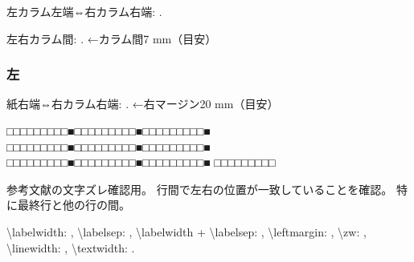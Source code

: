 \documentclass{FITpaper}
\begin{document}
左カラム左端⇔右カラム右端:
\prntlen{\textwidth}.

左右カラム間:
\prntlen{\columnsep}.
←カラム間7 mm（目安）

\subsubsection{左}

\newlength{\myright}
\setlength{\myright}{\paperwidth}

\addtolength\myright{-\myleft}
\addtolength\myright{-\textwidth}

紙右端⇔右カラム右端:
\prntlen{\myright}.
←右マージン20 mm（目安）


\begin{thebibliography}{9}

  □□□□□□□□□■□□□□□□□□□■□□□□□□□□□■
  □□□□□□□□□■□□□□□□□□□■□□□□□□□□□■
  □□□□□□□□□■□□□□□□□□□■□□□□□□□□□■
  □□□□□□□□□

  参考文献の文字ズレ確認用。
  行間で左右の位置が一致していることを確認。
  特に最終行と他の行の間。

  \textbackslash labelwidth: \the{},
  \textbackslash labelsep: \the{},
  \textbackslash labelwidth + \textbackslash labelsep:
  \newlength{\temptotal}\setlength{\temptotal}{\labelwidth}
  \addtolength{\temptotal}{\labelsep}\the\temptotal,
  \textbackslash leftmargin: \the\leftmargin,
  \textbackslash zw: \the\zw,
  \textbackslash linewidth: \the\linewidth,
  \textbackslash textwidth: \the\textwidth.

\end{thebibliography}
\end{document}
